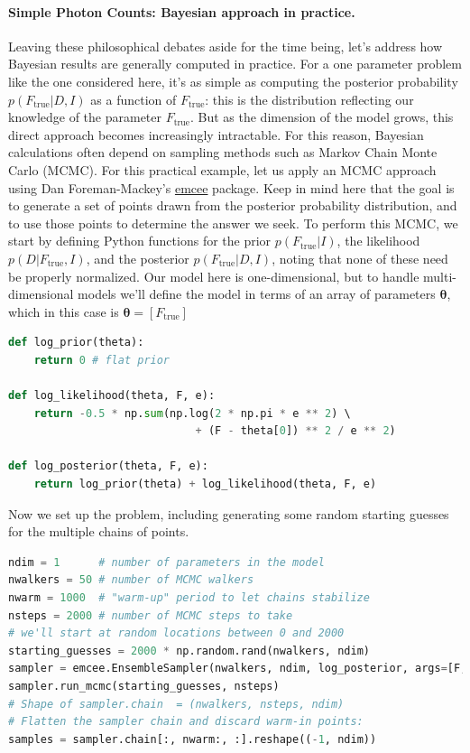 \documentclass[%
oneside,                 %
final,                   %
10pt]{article}
\begin{document}
\paragraph{Simple Photon Counts: Bayesian approach in practice.}
Leaving these philosophical debates aside for the time being, let's address how Bayesian results are generally computed in practice. For a one parameter problem like the one considered here, it's as simple as computing the posterior probability $p(F_\mathrm{true} | D,I)$ as a function of $F_\mathrm{true}$: this is the distribution reflecting our knowledge of the parameter $F_\mathrm{true}$.
But as the dimension of the model grows, this direct approach becomes increasingly intractable. For this reason, Bayesian calculations often depend on sampling methods such as Markov Chain Monte Carlo (MCMC). For this practical example, let us apply an MCMC approach using Dan Foreman-Mackey's \href{{http://dan.iel.fm/emcee/current/}}{emcee} package. Keep in mind here that the goal is to generate a set of points drawn from the posterior probability distribution, and to use those points to determine the answer we seek.
To perform this MCMC, we start by defining Python functions for the prior $p(F_\mathrm{true} | I)$, the likelihood $p(D | F_\mathrm{true},I)$, and the posterior $p(F_\mathrm{true} | D,I)$, noting that none of these need be properly normalized. Our model here is one-dimensional, but to handle multi-dimensional models we'll define the model in terms of an array of parameters $\boldsymbol{\theta}$, which in this case is $\boldsymbol{\theta} = [F_\mathrm{true}]$

\begin{lstlisting}[language=Python,style=blue1]
def log_prior(theta):
    return 0 # flat prior

def log_likelihood(theta, F, e):
    return -0.5 * np.sum(np.log(2 * np.pi * e ** 2) \ 
                             + (F - theta[0]) ** 2 / e ** 2)
                             
def log_posterior(theta, F, e):
    return log_prior(theta) + log_likelihood(theta, F, e)
\end{lstlisting}

Now we set up the problem, including generating some random starting guesses for the multiple chains of points.

\begin{lstlisting}[language=Python,style=blue1]
ndim = 1      # number of parameters in the model
nwalkers = 50 # number of MCMC walkers
nwarm = 1000  # "warm-up" period to let chains stabilize
nsteps = 2000 # number of MCMC steps to take
# we'll start at random locations between 0 and 2000
starting_guesses = 2000 * np.random.rand(nwalkers, ndim)
sampler = emcee.EnsembleSampler(nwalkers, ndim, log_posterior, args=[F,e])
sampler.run_mcmc(starting_guesses, nsteps)
# Shape of sampler.chain  = (nwalkers, nsteps, ndim)
# Flatten the sampler chain and discard warm-in points:
samples = sampler.chain[:, nwarm:, :].reshape((-1, ndim))
\end{lstlisting}
\end{document}
